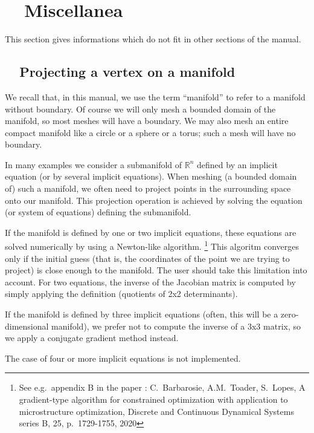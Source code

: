 
\chapter{~~Miscellanea}\label{\numb section 8}

This section gives informations which do not fit in other sections of the manual.


\section{~~Projecting a vertex on a manifold}\label{\numb section 8.\numb parag 1}

We recall that, in this manual, we use the term ``manifold'' to refer to a manifold without boundary.
Of course we will only mesh a bounded domain of the manifold, so most meshes will have a boundary.
We may also mesh an entire compact manifold like a circle or a sphere or a torus;
such a mesh will have no boundary.

In many examples we consider a submanifold of $ \mathbb{R}^n $ defined by an implicit equation
(or by several implicit equations).
When meshing (a bounded domain of) such a manifold, we often need to project points in
the surrounding space onto our manifold.
This projection operation is achieved by solving
the equation (or system of equations) defining the submanifold.

If the manifold is defined by one or two implicit equations,
these equations are solved numerically by using a Newton-like algorithm.
\footnote {{} See e.g.\ appendix B in the paper : C.~Barbarosie, A.M.~Toader, S.~Lopes,
A gradient-type algorithm for constrained optimization with application to microstructure optimization,
Discrete and Continuous Dynamical Systems series B, 25, p.\ 1729-1755, 2020}
This algoritm converges only if the initial guess (that is, the coordinates of the point we are
trying to project) is close enough to the manifold.
The user should take this limitation into account.
For two equations, the inverse of the Jacobian matrix is computed by simply applying the definition
(quotients of 2x2 determinants).

If the manifold is defined by three implicit equations (often, this will be a zero-dimensional manifold),
we prefer not to compute the inverse of a 3x3 matrix, so we apply a conjugate gradient method instead.

The case of four or more implicit equations is not implemented.

